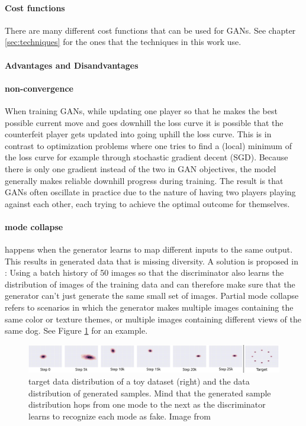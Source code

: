 \paragraph{Cost functions} There are many different cost functions that can be used for GANs. See chapter \ref{sec:techniques} for the ones that the techniques in this work use.


\paragraph{Advantages and Disandvantages}
\paragraph{non-convergence} When training GANs, while updating one player so that he makes the best possible current move and goes downhill the loss curve it is possible that the counterfeit player gets updated into going uphill the loss curve. This is in contrast to optimization problems where one tries to find a (local) minimum of the loss curve for example through stochastic gradient decent (SGD). Because there is only one gradient instead of the two in GAN objectives, the model generally makes reliable downhill progress during training. The result is that GANs often oscillate in practice due to the nature of having two players playing against each other, each trying to achieve the optimal outcome for themselves.

\paragraph{mode collapse} happens when the generator learns to map different inputs to the same output. This results in generated data that is missing diversity. A solution is proposed in : Using a batch history of 50 images so that the discriminator also learns the distribution of images of the training data and can therefore make sure that the generator can't just generate the same small set of images. Partial mode collapse refers to scenarios in which the generator makes multiple images containing the same color or texture themes, or multiple images containing different views of the same dog. See Figure \ref{fig:mode_collapse} for an example.


\begin{figure}
	\centering
	\includegraphics[width=\textwidth]{images/metz_et_al_mode_collapse.png}
	\caption{target data distribution of a toy dataset (right) and the data distribution of generated samples. Mind that the generated sample distribution hops from one mode to the next as the discriminator learns to recognize each mode as fake. Image from \cite{DBLP:journals/corr/MetzPPS16}}
	\label{fig:mode_collapse}
\end{figure}